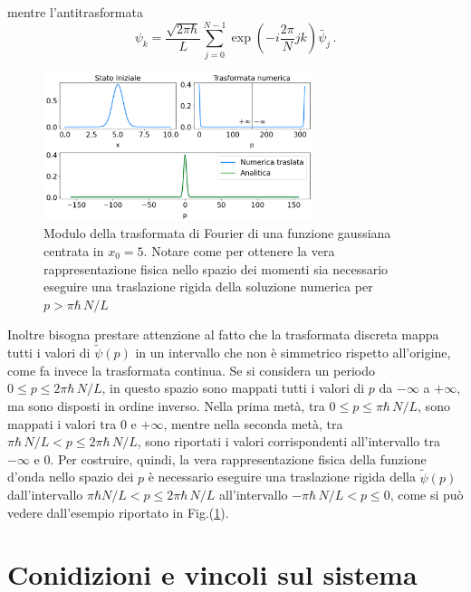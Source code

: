 \documentclass[12pt]{report}
\begin{document}
mentre l'antitrasformata
\begin{equation}
    \psi_k = \frac{\sqrt{2 \pi \hbar}}{L} \sum_{j=0}^{N-1}  \exp \left(-i \frac{2 \pi}{N} j k\right) \tilde{\psi_j} \, \text{.}
    \label{eq:dft_anti}
\end{equation}
\begin{figure}
    \centering
    \includegraphics[width = 0.7\textwidth]{immagini/fourier.png}
    \caption{ \textcolor{dark-gray}{Modulo della trasformata di Fourier di una funzione gaussiana centrata in $x_0 = 5$. Notare come per ottenere la vera rappresentazione fisica nello spazio dei momenti sia necessario eseguire una traslazione rigida della soluzione numerica per $p >   \pi \hbar \, N / L  $}}
    \label{fig:dft_shift}
\end{figure}
Inoltre bisogna prestare attenzione al fatto che %
la trasformata discreta mappa tutti i valori di $\tilde{\psi}(p)$ in un intervallo che non è simmetrico rispetto all'origine, come fa invece la trasformata continua. Se si considera un periodo $ 0 \le p \le 2 \pi \hbar \, N / L  $, in questo spazio sono mappati tutti i valori di $p$ da $- \infty$ a $+ \infty$, ma sono disposti in ordine inverso. Nella prima metà, tra $ 0 \le p \le \pi \hbar \, N / L  $, sono mappati i valori tra $0$ e $+ \infty$, mentre nella seconda metà, tra  $ \pi \hbar \, N / L  < p \le 2 \pi \hbar \, N / L $, sono riportati i valori corrispondenti all'intervallo tra $- \infty$ e $0$. Per costruire, quindi, la vera rappresentazione fisica della funzione d'onda nello spazio dei $p$ è necessario eseguire una traslazione rigida della $\tilde{\psi}(p)$ dall'intervallo $ \pi \hbar N / L < p \le 2 \pi \hbar \, N / L $ all'intervallo $ - \pi \hbar \, N / L  < p \le 0 $, come si può vedere dall'esempio riportato in Fig.(\ref{fig:dft_shift}).


\section{Conidizioni e vincoli sul sistema} %
\label{sec:limits}
\end{document}
